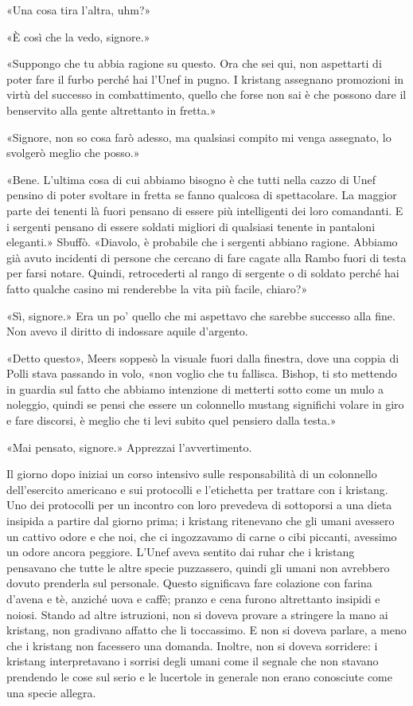 «Una cosa tira l'altra, uhm?»

«È così che la vedo, signore.»

«Suppongo che tu abbia ragione su questo. Ora che sei qui, non
aspettarti di poter fare il furbo perché hai l'Unef in pugno. I kristang
assegnano promozioni in virtù del successo in combattimento, quello che
forse non sai è che possono dare il benservito alla gente altrettanto in
fretta.»

«Signore, non so cosa farò adesso, ma qualsiasi compito mi venga
assegnato, lo svolgerò meglio che posso.»

«Bene. L'ultima cosa di cui abbiamo bisogno è che tutti nella cazzo di
Unef pensino di poter svoltare in fretta se fanno qualcosa di
spettacolare. La maggior parte dei tenenti là fuori pensano di essere
più intelligenti dei loro comandanti. E i sergenti pensano di essere
soldati migliori di qualsiasi tenente in pantaloni eleganti.» Sbuffò.
«Diavolo, è probabile che i sergenti abbiano ragione. Abbiamo già avuto
incidenti di persone che cercano di fare cagate alla Rambo fuori di
testa per farsi notare. Quindi, retrocederti al rango di sergente o di
soldato perché hai fatto qualche casino mi renderebbe la vita più
facile, chiaro?»

«Sì, signore.» Era un po' quello che mi aspettavo che sarebbe successo
alla fine. Non avevo il diritto di indossare aquile d'argento.

«Detto questo», Meers soppesò la visuale fuori dalla finestra, dove una
coppia di Polli stava passando in volo, «non voglio che tu fallisca.
Bishop, ti sto mettendo in guardia sul fatto che abbiamo intenzione di
metterti sotto come un mulo a noleggio, quindi se pensi che essere un
colonnello mustang significhi volare in giro e fare discorsi, è meglio
che ti levi subito quel pensiero dalla testa.»

«Mai pensato, signore.» Apprezzai l'avvertimento.

\hfill\break

Il giorno dopo iniziai un corso intensivo sulle responsabilità di un
colonnello dell'esercito americano e sui protocolli e l'etichetta per
trattare con i kristang. Uno dei protocolli per un incontro con loro
prevedeva di sottoporsi a una dieta insipida a partire dal giorno prima;
i kristang ritenevano che gli umani avessero un cattivo odore e che noi,
che ci ingozzavamo di carne o cibi piccanti, avessimo un odore ancora
peggiore. L'Unef aveva sentito dai ruhar che i kristang pensavano che
tutte le altre specie puzzassero, quindi gli umani non avrebbero dovuto
prenderla sul personale. Questo significava fare colazione con farina
d'avena e tè, anziché uova e caffè; pranzo e cena furono altrettanto
insipidi e noiosi. Stando ad altre istruzioni, non si doveva provare a
stringere la mano ai kristang, non gradivano affatto che li toccassimo.
E non si doveva parlare, a meno che i kristang non facessero una
domanda. Inoltre, non si doveva sorridere: i kristang interpretavano i
sorrisi degli umani come il segnale che non stavano prendendo le cose
sul serio e le lucertole in generale non erano conosciute come una
specie allegra.

